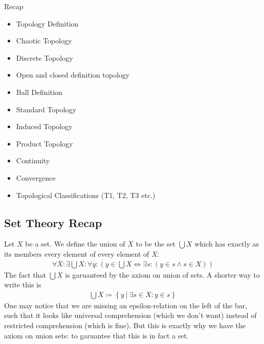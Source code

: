 Recap
\begin{itemize}
    \item Topology Definition
    \item Chaotic Topology
    \item Discrete Topology
    \item Open and closed definition topology
    \item Ball Definition
    \item Standard Topology
    \item Induced Topology
    \item Product Topology
    \item Continuity
    \item Convergence
    \item Topological Classifications (T1, T2, T3 etc.)
\end{itemize}

\subsection{Set Theory Recap}
\begin{definition}[Union]
    Let \(X\) be a set. We define the union of \(X\) to be the set \(\bigcup X\) which has exactly as its members every element of every element of \(X\): \begin{align*}
        \forall X: \exists \bigcup X : \forall y : \left(y \in \bigcup X \iff \exists s : (y \in s \wedge s \in X)\right)
    \end{align*}
    The fact that \(\bigcup X\) is garuanteed by the axiom on union of sets. A shorter way to write this is \begin{align*}
        \bigcup X \coloneqq \left\{ y \ \big| \ \exists s \in X : y \in s\right\} 
    \end{align*}
    One may notice that we are missing an epsilon-relation on the left of the bar, such that it looks like universal comprehension (which we don't want) instead of restricted comprehension (which is fine). But this is exactly why we have the axiom on union sets: to garuantee that this is in fact a set.
\end{definition}

